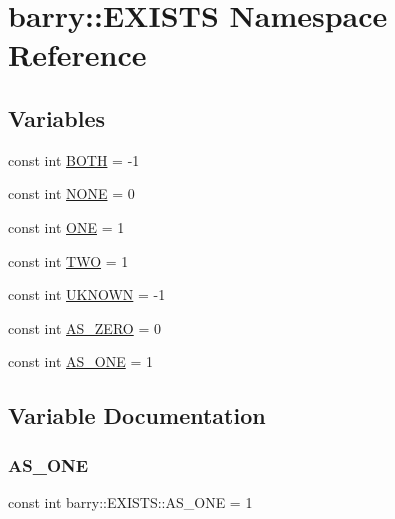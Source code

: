 \hypertarget{namespacebarry_1_1_e_x_i_s_t_s}{}\section{barry\+:\+:E\+X\+I\+S\+TS Namespace Reference}
\label{namespacebarry_1_1_e_x_i_s_t_s}
\subsection*{Variables}
\begin{DoxyCompactItemize}
\item 
const int \hyperlink{namespacebarry_1_1_e_x_i_s_t_s_aac36d54d92c9ec1d030e8c08d0594a47}{B\+O\+TH} = -\/1
\item 
const int \hyperlink{namespacebarry_1_1_e_x_i_s_t_s_a67dfa30940f84313c4936321298e5b1b}{N\+O\+NE} = 0
\item 
const int \hyperlink{namespacebarry_1_1_e_x_i_s_t_s_a9f25c9b3787f9e1cf03e28f5a6dbe725}{O\+NE} = 1
\item 
const int \hyperlink{namespacebarry_1_1_e_x_i_s_t_s_ac6cc1f304cbfc3576d15294cef82c868}{T\+WO} = 1
\item 
const int \hyperlink{namespacebarry_1_1_e_x_i_s_t_s_a95d6fdf6b1f3028fff8f2aef01f50f65}{U\+K\+N\+O\+WN} = -\/1
\item 
const int \hyperlink{namespacebarry_1_1_e_x_i_s_t_s_aa86651704b200b6bb125b289fb5b3cfc}{A\+S\+\_\+\+Z\+E\+RO} = 0
\item 
const int \hyperlink{namespacebarry_1_1_e_x_i_s_t_s_a5b06fbd1208ff2094213da0791609950}{A\+S\+\_\+\+O\+NE} = 1
\end{DoxyCompactItemize}


\subsection{Variable Documentation}
\mbox{\label{namespacebarry_1_1_e_x_i_s_t_s_a5b06fbd1208ff2094213da0791609950}} 
\subsubsection{\texorpdfstring{A\+S\+\_\+\+O\+NE}{AS\_ONE}}
{\footnotesize\ttfamily const int barry\+::\+E\+X\+I\+S\+T\+S\+::\+A\+S\+\_\+\+O\+NE = 1}



